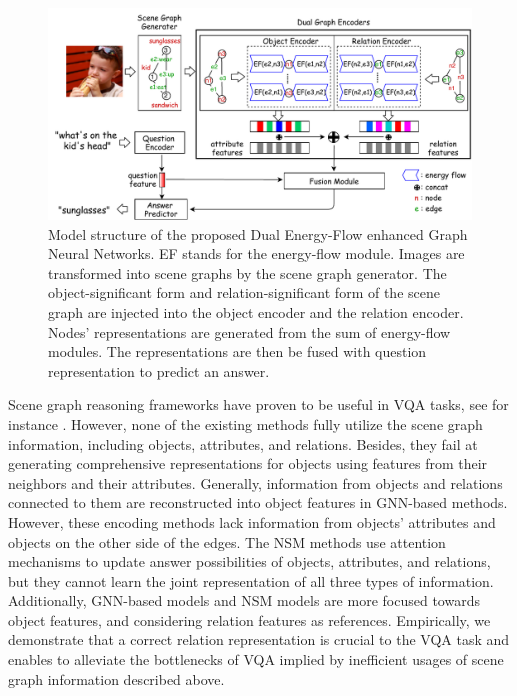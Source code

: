 \documentclass[letterpaper]{article} %
\begin{document}
\begin{figure}[ht] 
    \vspace{-0.5in}
    \centering 
    \includegraphics[width=1.0\textwidth]{./pic/DE-GNN2.pdf} 
    \caption{Model structure of the proposed Dual Energy-Flow enhanced Graph Neural Networks. EF stands for the energy-flow module. Images are transformed into scene graphs by the scene graph generator. The object-significant form and relation-significant form of the scene graph are injected into the object encoder and the relation encoder. Nodes' representations are generated from the sum of energy-flow modules. The representations are then be fused with question representation to predict an answer.} 
    \label{fig2} 
\end{figure}


Scene graph reasoning frameworks have proven to be useful in VQA tasks, see for instance \cite{johnson2015image,DBLP:journals/corr/abs-2007-01072,yang2020prior}. 
However, none of the existing methods fully utilize the scene graph information, including objects, attributes, and relations.
Besides, they fail at generating comprehensive representations for objects using features from their neighbors and their attributes. 
Generally, information from objects and relations connected to them are reconstructed into object features in GNN-based methods.
However, these encoding methods lack information from objects' attributes and objects on the other side of the edges. 
The NSM methods use attention mechanisms to update answer possibilities of objects, attributes, and relations, but they cannot learn the joint representation of all three types of information. 
Additionally, GNN-based models and NSM models are more focused towards object features, and considering relation features as references. 
Empirically, we demonstrate that a correct relation representation is crucial to the VQA task and enables to alleviate the bottlenecks of VQA implied by inefficient usages of scene graph information described above.
\end{document}
